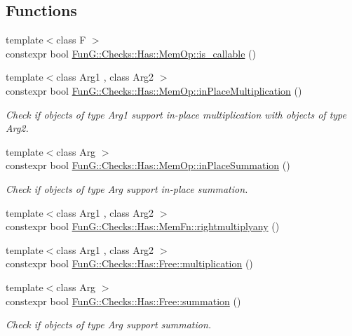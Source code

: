 \subsection*{\-Functions}
\begin{DoxyCompactItemize}
\item 
{\footnotesize template$<$class F $>$ }\\constexpr bool \hyperlink{namespaceFunG_1_1Checks_1_1Has_1_1MemOp_a5810c07eff37faaf76b881548a6722bd}{\-Fun\-G\-::\-Checks\-::\-Has\-::\-Mem\-Op\-::is\-\_\-callable} ()
\item 
{\footnotesize template$<$class Arg1 , class Arg2 $>$ }\\constexpr bool \hyperlink{namespaceFunG_1_1Checks_1_1Has_1_1MemOp_ae8e502928ebc6342cab98ebbb62b8802}{\-Fun\-G\-::\-Checks\-::\-Has\-::\-Mem\-Op\-::in\-Place\-Multiplication} ()
\begin{DoxyCompactList}\small\item\em \-Check if objects of type \-Arg1 support in-\/place multiplication with objects of type \-Arg2. \end{DoxyCompactList}\item 
{\footnotesize template$<$class Arg $>$ }\\constexpr bool \hyperlink{namespaceFunG_1_1Checks_1_1Has_1_1MemOp_a23052f7d8da399943f6354a7d477c825}{\-Fun\-G\-::\-Checks\-::\-Has\-::\-Mem\-Op\-::in\-Place\-Summation} ()
\begin{DoxyCompactList}\small\item\em \-Check if objects of type \-Arg support in-\/place summation. \end{DoxyCompactList}\item 
{\footnotesize template$<$class Arg1 , class Arg2 $>$ }\\constexpr bool \hyperlink{namespaceFunG_1_1Checks_1_1Has_1_1MemFn_adeb3d401c6464514644930596c3a4ccc}{\-Fun\-G\-::\-Checks\-::\-Has\-::\-Mem\-Fn\-::rightmultiplyany} ()
\item 
{\footnotesize template$<$class Arg1 , class Arg2 $>$ }\\constexpr bool \hyperlink{namespaceFunG_1_1Checks_1_1Has_1_1Free_a2454bd1f5873cc86ec31d09d822a67b1}{\-Fun\-G\-::\-Checks\-::\-Has\-::\-Free\-::multiplication} ()
\item 
{\footnotesize template$<$class Arg $>$ }\\constexpr bool \hyperlink{namespaceFunG_1_1Checks_1_1Has_1_1Free_a1cf46f7335354d21dff506aaf812b4f5}{\-Fun\-G\-::\-Checks\-::\-Has\-::\-Free\-::summation} ()
\begin{DoxyCompactList}\small\item\em \-Check if objects of type \-Arg support summation. \end{DoxyCompactList}\item 

\end{DoxyCompactItemize}
